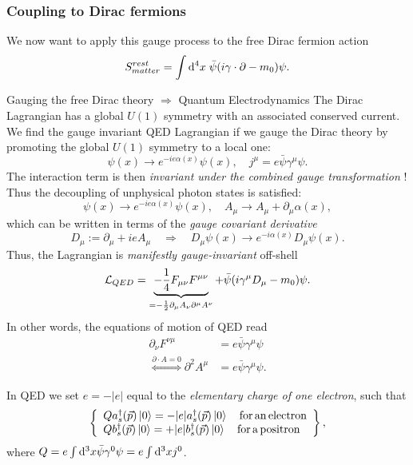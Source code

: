 \subsubsection{Coupling to Dirac fermions}
We now want to apply this gauge process to the free Dirac fermion action
\begin{equation}
	S^{rest}_{matter} = \int \mathrm{d}^4 x \; \bar{\psi} (i \gamma \cdot \partial - m_0 ) \psi.
\end{equation}
\begin{mybox}{Gauging the free Dirac theory $\Rightarrow$ Quantum Electrodynamics}
	The Dirac Lagrangian has a global $U(1)$ symmetry with an associated conserved current. We find the gauge invariant QED Lagrangian if we gauge the Dirac theory by promoting the global $U(1)$ symmetry to a local one:
	\begin{equation}
		\psi(x) \rightarrow e^{-i e \alpha(x)} \psi(x), \quad j^{\mu} = e \bar{\psi} \gamma^{\mu} \psi.
	\end{equation}
	The interaction term is then \emph{invariant under the combined gauge transformation} ! Thus the decoupling of unphysical photon states is satisfied:
	\begin{equation}
		\psi(x) \rightarrow e^{-i e \alpha(x) } \psi(x), \quad A_{\mu} \rightarrow A_{\mu} + \partial_{\mu} \alpha(x),
	\end{equation}
	which can be written in terms of the \emph{gauge covariant derivative}
	\begin{equation}
		D_{\mu} := \partial_{\mu} + i e A_{\mu} \quad \Rightarrow \quad D_{\mu} \psi(x) \rightarrow e^{-i \alpha(x)} D_{\mu} \psi(x).
	\end{equation}
	Thus, the Lagrangian is \emph{manifestly gauge-invariant} off-shell
	\begin{equation}
		\mathcal{L}_{QED} = \underbrace{- \frac{1}{4} F_{\mu \nu} F^{\mu \nu} }_{=-\frac{1}{2} \partial_{\mu} A_{\nu} \partial^{\mu} A^{\nu}} + \bar{\psi} (i \gamma^{\mu} D_{\mu} -m_0) \psi.
	\end{equation}
	In other words, the equations of motion of QED read
	\begin{align}
		\partial_{\nu} F^{\nu \mu} &= e \bar{\psi} \gamma^{\mu} \psi \\
		\stackrel{\partial \cdot A=0}{\Leftrightarrow} \partial^2 A^{\mu} &= e \bar{\psi} \gamma^{\mu} \psi.
	\end{align}
	
\end{mybox}
In QED we set $e=-|e|$ equal to the \emph{elementary charge of one electron}, such that 
\begin{equation}
	\left\{	
	\begin{array}{lr}
	Qa^{\dagger}_s(\vec{p}) \ket{0} =- |e| a^{\dagger}_s(\vec{p}) \ket{0} \quad \mathrm{for \, an \, electron} \\
	Q b^{\dagger}_s(\vec{p}) \ket{0} = + |e| b^{\dagger}_s(\vec{p} ) \ket{0} \quad \mathrm{for \, a \, positron}
	\end{array}
	\right\},
\end{equation}
where $Q=e \int \mathrm{d}^3 x \bar{\psi} \gamma^0 \psi = e \int \mathrm{d}^3 x j^0$.
\\
\\
